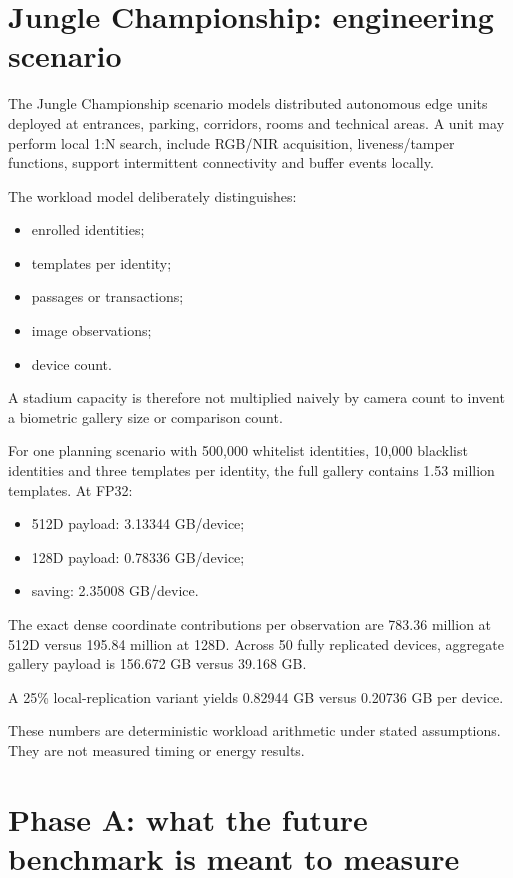 \documentclass[10pt,a4paper]{article}
\begin{document}
\section{Jungle Championship: engineering scenario}

The Jungle Championship scenario models distributed autonomous edge units deployed at entrances, parking,
corridors, rooms and technical areas. A unit may perform local 1:N search, include RGB/NIR acquisition,
liveness/tamper functions, support intermittent connectivity and buffer events locally.

The workload model deliberately distinguishes:

\begin{itemize}
\item enrolled identities;
\item templates per identity;
\item passages or transactions;
\item image observations;
\item device count.
\end{itemize}

A stadium capacity is therefore not multiplied naively by camera count to invent a biometric gallery size or
comparison count.

For one planning scenario with 500,000 whitelist identities, 10,000 blacklist identities and three templates
per identity, the full gallery contains 1.53 million templates. At FP32:

\begin{itemize}
\item 512D payload: 3.13344 GB/device;
\item 128D payload: 0.78336 GB/device;
\item saving: 2.35008 GB/device.
\end{itemize}

The exact dense coordinate contributions per observation are 783.36 million at 512D versus 195.84 million at
128D. Across 50 fully replicated devices, aggregate gallery payload is 156.672 GB versus 39.168 GB.

A 25\% local-replication variant yields 0.82944 GB versus 0.20736 GB per device.

These numbers are deterministic workload arithmetic under stated assumptions. They are not measured timing
or energy results.

\section{Phase A: what the future benchmark is meant to measure}
\end{document}
